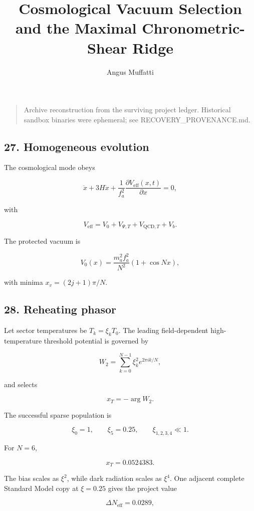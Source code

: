 \documentclass[
]{article}
\title{Cosmological Vacuum Selection and the Maximal Chronometric-Shear
Ridge}
\author{Angus Muffatti}
\date{}
\begin{document}
\maketitle

\begin{quote}
Archive reconstruction from the surviving project ledger. Historical
sandbox binaries were ephemeral; see RECOVERY\_PROVENANCE.md.
\end{quote}

\hypertarget{homogeneous-evolution}{%
\subsection{27. Homogeneous evolution}\label{homogeneous-evolution}}

The cosmological mode obeys

\[
\ddot x+3H\dot x+\frac{1}{f_a^2}
\frac{\partial V_{\mathrm{eff}}(x,t)}{\partial x}=0,
\]

with

\[
V_{\mathrm{eff}}=V_0+V_{\Psi,T}+V_{{\mathrm{QCD}},T}+V_b.
\]

The protected vacuum is

\[
V_0(x)=\frac{m_a^2f_a^2}{N^2}(1+\cos Nx),
\]

with minima \(x_v=(2j+1)\pi/N\).

\hypertarget{reheating-phasor}{%
\subsection{28. Reheating phasor}\label{reheating-phasor}}

Let sector temperatures be \(T_k=\xi_kT_0\). The leading field-dependent
high-temperature threshold potential is governed by

\[
W_2=\sum_{k=0}^{N-1}\xi_k^2e^{2\pi ik/N},
\]

and selects

\[
x_T=-\arg W_2.
\]

The successful sparse population is

\[
\xi_0=1,
\qquad
\xi_5=0.25,
\qquad
\xi_{1,2,3,4}\ll1.
\]

For \(N=6\),

\[
x_T=0.0524383.
\]

The bias scales as \(\xi^2\), while dark radiation scales as \(\xi^4\).
One adjacent complete Standard Model copy at \(\xi=0.25\) gives the
project value

\[
\Delta N_{\mathrm{eff}}=0.0289,
\]
\end{document}
